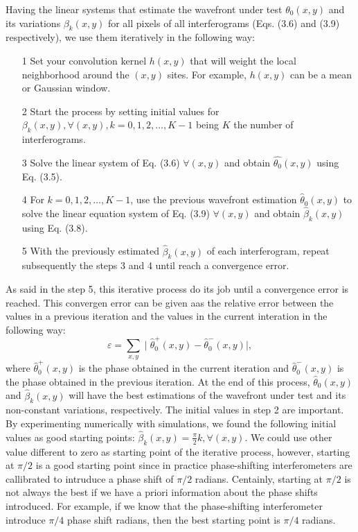 Having the linear systems that estimate the wavefront under test $\theta_0(x,y)$
and its variations $\beta_k(x,y)$ for all pixels of all interferograms (Eqs.
(3.6) and (3.9) respectively), we use them iteratively in the following way:

\begin{itemize}
 \item[1] Set your convolution kernel $h(x,y)$ that will weight the local
 neighborhood around the $(x,y)$ sites. For example, $h(x,y)$ can be a mean or
 Gaussian window.
 \item[2] Start the process by setting initial values for $\beta_k(x,y),
 \forall (x,y), k = 0,1,2,\dots,K-1$ being $K$ the number of interferograms.
 \item[3] Solve the linear system of Eq. (3.6) $\forall(x,y)$ and obtain 
 $\hat{\theta_0} (x,y)$ using Eq. (3.5).
 \item[4] For $k = 0,1,2,\dots,K-1$, use the previous wavefront estimation
 $\hat{\theta}_0 (x,y)$ to solve the linear equation system of Eq. (3.9)
 $\forall(x,y)$ and obtain $\hat{\beta}_k(x,y)$ using Eq. (3.8).
 \item[5] With the previously estimated $\hat{\beta}_k(x,y)$ of each
 interferogram, repeat subsequently the steps 3 and 4 until reach a convergence
 error.
\end{itemize}
As said in the step 5, this iterative process do its job until a convergence
error is reached. This convergen error can be given aas the relative error
between the values in a previous iteration and the values in the current
interation in the following way:
\begin{equation}
 \varepsilon=\sum_{x,y}\mid\hat{\theta}_{0}^{+}(x,y)-\hat{\theta}_{0}^{-}(x,y)
 \mid,
\end{equation}
where $\hat{\theta}_{0}^{+}(x,y)$ is the phase obtained in the current iteration
and $\hat{\theta}_{0}^{-}(x,y)$ is the phase obtained in the previous iteration.
At the end of this process, $\hat{\theta}_{0}(x,y)$ and $\hat{\beta}_k(x,y)$
will have the best estimations of the wavefront under test and its non-constant
variations, respectively. The initial values in step 2 are important. By
experimenting numerically with simulations, we found the following initial
values as good starting points: $\hat{\beta}_k(x,y) = \frac{\pi}{2}k, 
\forall(x,y)$. We could use other value different to zero as starting point of
the iterative process, however, starting at $\pi/2$ is a good starting point
since in practice phase-shifting interferometers are callibrated to intruduce
a phase shift of $\pi/2$ radians. Centainly, starting at $\pi/2$ is not always
the best if we have a priori information about the phase shifts introduced. For
example, if we know that the phase-shifting interferometer introduce $\pi/4$
phase shift radians, then the best starting point is $\pi/4$ radians.

